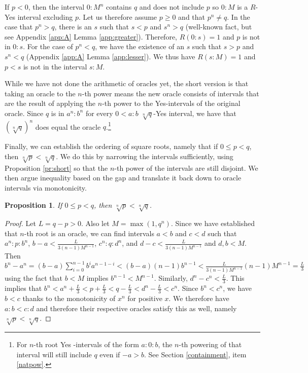\documentclass[12pt]{article}
\newtheorem{proposition}{Proposition}[subsection]
\theoremstyle{remark}
\begin{document}
\begin{enumerate}
    If $p < 0$, then the interval $0:M^n$ contains $q$ and does not include $p$ so $0:M$ is a $R$-Yes interval excluding $p$. Let us therefore assume $p \geq 0$ and that $p^n \neq q$. In the case that $p^n > q$, there is an $s$ such that $s<p$ and $s^n > q$ (well-known fact, but see Appendix \ref{app:A} Lemma \ref{app:greater}). Therefore, $R(0:s) = 1$ and $p$ is not in $0:s$. For the case of $p^n < q$, we have the existence of an $s$ such that $s > p$ and $s^n < q$ (Appendix \ref{app:A} Lemma \ref{app:lesser}). We thus have $R(s:M)=1$ and $p < s$ is not in the interval $s:M$.
    
\end{enumerate}

While we have not done the arithmetic of oracles yet, the short version is that taking an oracle to the $n$-th power means the new oracle consists of intervals that are the result of applying the $n$-th power to the Yes-intervals of the original oracle. Since $q$ is in $a^n:b^n$ for every $0<a:b$ $\sqrt[n]{q}$-Yes interval, we have that $(\sqrt[n]{q})^n$ does equal the oracle $q$.\footnote{For $n$-th root Yes -intervals of the form $a:0:b$, the $n$-th powering of that interval will still include $q$ even if $-a>b$. See Section \ref{containment}, item \ref{natpow}.} 

Finally, we can establish the ordering of square roots, namely that if $0 \leq p<q$, then $\sqrt[n]{p} < \sqrt[n]{q}$. We do this by narrowing the intervals sufficiently, using Proposition \ref{pr:short} so that the $n$-th power of the intervals are still disjoint. We then argue inequality based on the gap and translate it back down to oracle intervals via monotonicity. 

\begin{proposition}
    If $0 \leq p <q$, then $\sqrt[n]{p} < \sqrt[n]{q}$.
\end{proposition}

\begin{proof}
    Let $L = q-p > 0$. Also let $M = \max(1, q^n)$.  Since we have established that $n$-th root is an oracle, we can find intervals $a\lt b$ and $c \lt d$ such that $a^n:p:b^n$, $b-a < \frac{L}{3(n-1)M^{n-1}}$, $c^n:q:d^n$, and $d-c < \frac{L}{3(n-1)M^{n-1}}$ and $d, b < M$.  Then $b^n-a^n = (b-a) \sum_{i=0}^{n-1} b^i a^{n-1-i} < (b-a)(n-1) b^{n-1} < \frac{L}{3(n-1)M^{n-1}} (n-1) M^{n-1} = \frac{L}{3}$ using the fact that $b<M$ implies $b^{n-1} < M^{n-1}$. Similarly, $d^n-c^n < \frac{L}{3}$. This implies that $b^n < a^n + \frac{L}{3} < p + \frac{L}{3} < q -  \frac{L}{3} < d^n - \frac{L}{3} < c^n$. Since $b^n < c^n$, we have $b < c$ thanks to the monotonicity of $x^n$ for positive $x$. We therefore have $a:b < c:d$ and therefore their respective oracles satisfy this as well, namely $\sqrt[n]{p} < \sqrt[n]{q}$.
\end{proof}
\end{document}
